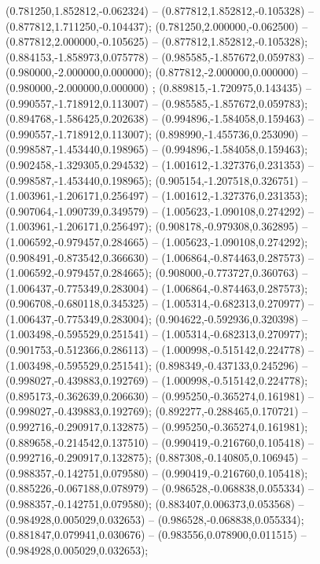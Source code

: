  (0.781250,1.852812,-0.062324) -- (0.877812,1.852812,-0.105328) -- (0.877812,1.711250,-0.104437);
 (0.781250,2.000000,-0.062500) -- (0.877812,2.000000,-0.105625) -- (0.877812,1.852812,-0.105328);
 (0.884153,-1.858973,0.075778) -- (0.985585,-1.857672,0.059783) -- (0.980000,-2.000000,0.000000);
 (0.877812,-2.000000,0.000000) -- (0.980000,-2.000000,0.000000) ;
 (0.889815,-1.720975,0.143435) -- (0.990557,-1.718912,0.113007) -- (0.985585,-1.857672,0.059783);
 (0.894768,-1.586425,0.202638) -- (0.994896,-1.584058,0.159463) -- (0.990557,-1.718912,0.113007);
 (0.898990,-1.455736,0.253090) -- (0.998587,-1.453440,0.198965) -- (0.994896,-1.584058,0.159463);
 (0.902458,-1.329305,0.294532) -- (1.001612,-1.327376,0.231353) -- (0.998587,-1.453440,0.198965);
 (0.905154,-1.207518,0.326751) -- (1.003961,-1.206171,0.256497) -- (1.001612,-1.327376,0.231353);
 (0.907064,-1.090739,0.349579) -- (1.005623,-1.090108,0.274292) -- (1.003961,-1.206171,0.256497);
 (0.908178,-0.979308,0.362895) -- (1.006592,-0.979457,0.284665) -- (1.005623,-1.090108,0.274292);
 (0.908491,-0.873542,0.366630) -- (1.006864,-0.874463,0.287573) -- (1.006592,-0.979457,0.284665);
 (0.908000,-0.773727,0.360763) -- (1.006437,-0.775349,0.283004) -- (1.006864,-0.874463,0.287573);
 (0.906708,-0.680118,0.345325) -- (1.005314,-0.682313,0.270977) -- (1.006437,-0.775349,0.283004);
 (0.904622,-0.592936,0.320398) -- (1.003498,-0.595529,0.251541) -- (1.005314,-0.682313,0.270977);
 (0.901753,-0.512366,0.286113) -- (1.000998,-0.515142,0.224778) -- (1.003498,-0.595529,0.251541);
 (0.898349,-0.437133,0.245296) -- (0.998027,-0.439883,0.192769) -- (1.000998,-0.515142,0.224778);
 (0.895173,-0.362639,0.206630) -- (0.995250,-0.365274,0.161981) -- (0.998027,-0.439883,0.192769);
 (0.892277,-0.288465,0.170721) -- (0.992716,-0.290917,0.132875) -- (0.995250,-0.365274,0.161981);
 (0.889658,-0.214542,0.137510) -- (0.990419,-0.216760,0.105418) -- (0.992716,-0.290917,0.132875);
 (0.887308,-0.140805,0.106945) -- (0.988357,-0.142751,0.079580) -- (0.990419,-0.216760,0.105418);
 (0.885226,-0.067188,0.078979) -- (0.986528,-0.068838,0.055334) -- (0.988357,-0.142751,0.079580);
 (0.883407,0.006373,0.053568) -- (0.984928,0.005029,0.032653) -- (0.986528,-0.068838,0.055334);
 (0.881847,0.079941,0.030676) -- (0.983556,0.078900,0.011515) -- (0.984928,0.005029,0.032653);
